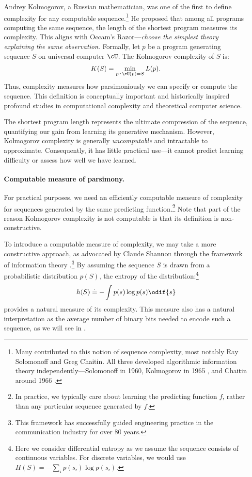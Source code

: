 \documentclass[../../book-main.tex]{subfiles}
\begin{document}
Andrey Kolmogorov, a Russian mathematician, was one of the first to
define complexity for any computable sequence.\footnote{Many
    contributed to this notion of sequence complexity, most notably Ray
    Solomonoff and Greg Chaitin. All three developed algorithmic
    information theory independently---Solomonoff in 1960, Kolmogorov in
    1965 \cite{Kolmogorov1998OnTO}, and Chaitin around 1966
\cite{Chaitin-1966}.} He proposed that among all programs computing
the same sequence, the length of the shortest program measures its
complexity. This aligns with Occam's Razor---\textit{choose the
simplest theory explaining the same observation}. Formally, let \(p\)
be a program generating sequence \(S\) on universal computer \(\cU\).
The Kolmogorov complexity of \(S\) is:
\begin{equation}
    K(S) = \min_{p\,:\, \cU(p) = S} L(p).
\end{equation}
Thus, complexity measures how parsimoniously we can specify or
compute the sequence. This definition is conceptually important and
historically inspired profound studies in computational complexity
and theoretical computer science.

The shortest program length represents the ultimate compression of
the sequence, quantifying our gain from learning its generative
mechanism. However, Kolmogorov complexity is generally {\em
uncomputable} \cite{Cover-Thomas} and intractable to approximate.
Consequently, it has little practical use---it cannot predict
learning difficulty or assess how well we have learned.

\paragraph{Computable measure of parsimony.}
For practical purposes, we need an efficiently computable measure of
complexity for sequences generated by the same predicting
function.\footnote{In practice, we typically care about learning the
    predicting function \(f\), rather than any particular sequence
generated by \(f\).} Note that part of the reason Kolmogorov
complexity is not computable is that its definition is non-constructive.

To introduce a computable measure of complexity, we may take a more
constructive approach, as advocated by Claude Shannon through the
framework of information theory
\cite{Shannon-1948,Cover-Thomas}.\footnote{This framework has
    successfully guided engineering practice in the communication
industry for over 80 years.} By assuming the sequence \(S\) is drawn
from a probabilistic distribution \(p(S)\), the entropy of the
distribution:\footnote{Here we consider differential entropy as we
    assume the sequence consists of continuous variables. For discrete
variables, we would use \(H(S) = - \sum_{i}p(s_{i}) \log p(s_{i})\).}
\begin{equation}
    h(S) \doteq -\int p(s) \log p(s) \odif{s}
    \label{eqn:entropy-definition}
\end{equation}
provides a natural measure of its complexity. This measure also has a
natural interpretation as the average number of binary bits needed to
encode such a sequence, as we will see in .
\end{document}
